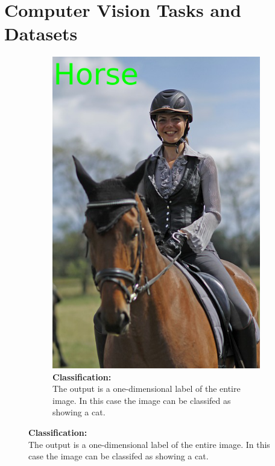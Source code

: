 \section{Computer Vision Tasks and Datasets} \label{sec:tasks}



\begin{figure}
    \begin{subfigure}[t]{0.32\columnwidth}
    \centering
        \includegraphics[width=\columnwidth]{figures/horsewoman_class.png}
        \caption{\textbf{Classification:} \\ The output is a one-dimensional label of the entire image. In this case the image can be classifed as showing a cat.}
        \label{fig:sfig1}
    \end{subfigure}\hspace{0.004\textwidth}

\end{figure}
